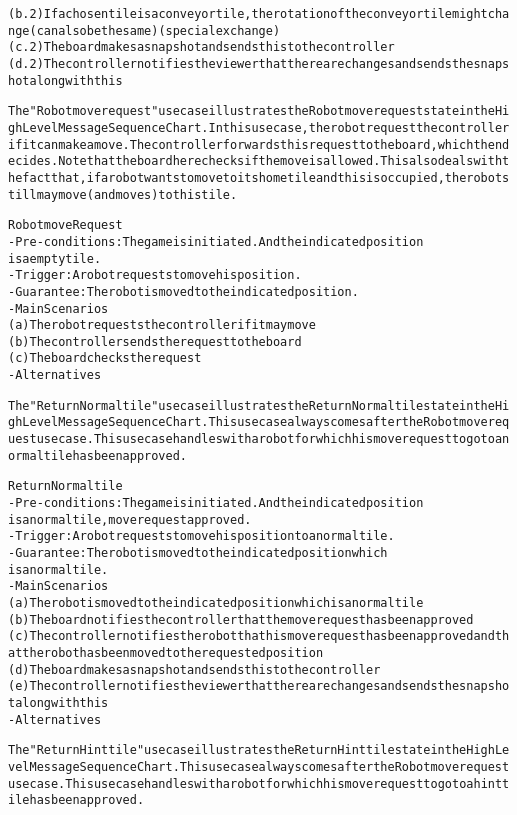 \begin{alltt}
    (b.2) If a chosen tile is a conveyor tile, the rotation of the conveyor tile might change (can also be the same) (special exchange)
    (c.2) The board makes a snapshot and sends this to the controller
    (d.2) The controller notifies the viewer that there are changes and sends the snapshot along with this

The "Robot move request" use case illustrates the Robot move request state in the High Level Message Sequence Chart. In this use case, the robot request the controller if it can make a move. The controller forwards this request to the board, which then decides. Note that the board here checks if the move is allowed. This also deals with the fact that, if a robot wants to move to its home tile and this is occupied, the robot still may move (and moves) to this tile.

Robot move Request
- Pre-conditions: The game is initiated. And the indicated position
    is a empty tile.
- Trigger: A robot requests to move his position.
- Guarantee: The robot is moved to the indicated position.
- Main Scenarios
    (a) The robot requests the controller if it may move
    (b) The controller sends the request to the board
    (c) The board checks the request
- Alternatives

The "Return Normal tile" use case illustrates the Return Normal tile state in the High Level Message Sequence Chart. This use case always comes after the Robot move request use case. This use case handles with a robot for which his move request to go to a normal tile has been approved.

Return Normal tile
- Pre-conditions: The game is initiated. And the indicated position
    is a normal tile, move request approved.
- Trigger: A robot requests to move his position to a normal tile.
- Guarantee: The robot is moved to the indicated position which
    is a normal tile.
- Main Scenarios
    (a) The robot is moved to the indicated position which is a normal tile
    (b) The board notifies the controller that the move request has been approved
    (c) The controller notifies the robot that his move request has been approved and that the robot has been moved to the requested position
    (d) The board makes a snapshot and sends this to the controller
    (e) The controller notifies the viewer that there are changes and sends the snapshot along with this
- Alternatives

The "Return Hint tile" use case illustrates the Return Hint tile state in the High Level Message Sequence Chart. This use case always comes after the Robot move request use case. This use case handles with a robot for which his move request to go to a hint tile has been approved.


\end{alltt}
